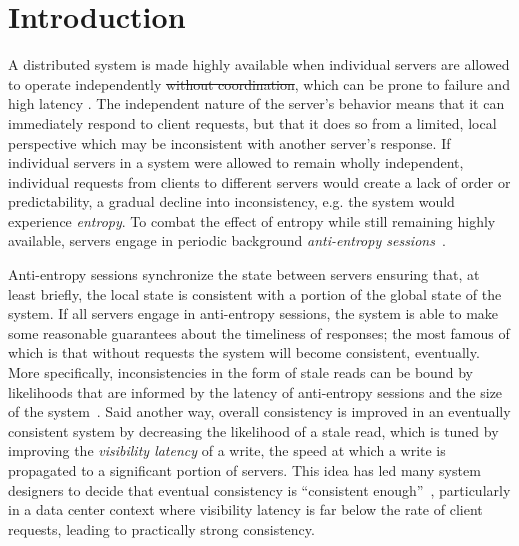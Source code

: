 \section*{Introduction}

A distributed system is made highly available when individual servers are
allowed to operate independently \sout{without coordination}, which can be prone to
failure and high latency .
The independent nature of the server's behavior means that it can immediately
respond to client requests, but that it does so from a limited, local
perspective which may be inconsistent with another server's response.
If individual servers in a system were allowed to remain wholly independent,
individual requests from clients to different servers would create a lack of
order or predictability, a gradual decline into inconsistency, e.g. the
system would experience \textit{entropy}.
To combat the effect of entropy while still remaining highly available,
servers engage in periodic background \textit{anti-entropy
  sessions}~\cite{terry_session_1994}.

Anti-entropy sessions synchronize the state between servers ensuring that,
at least briefly, the local state is consistent with a portion of the global
state of the system.
If all servers engage in anti-entropy sessions, the system is able to make
some reasonable guarantees about the timeliness of responses; the most famous
of which is that without requests the system will become
consistent, eventually.
More specifically, inconsistencies in the form of stale reads can be bound by
likelihoods that are informed by the latency of anti-entropy sessions and the
size of the system~\cite{bailis_quantifying_2014}.
Said another way, overall consistency is improved in an eventually consistent
system by decreasing the likelihood of a stale read, which is tuned by
improving the \textit{visibility latency} of a write, the speed at which a
write is propagated to a significant portion of servers.
This idea has led many system designers to decide that eventual consistency
is ``consistent enough''~\cite{bermbach_eventual_2011,wada_data_2011},
particularly in a data center context where visibility latency is far below
the rate of client requests, leading to practically strong consistency.

